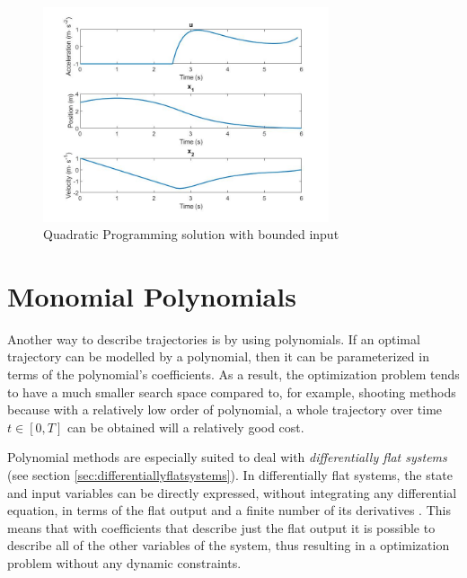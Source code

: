 \begin{figure}[h!]
\centering
\includegraphics[width=0.75\textwidth]{Images/quad_prog_constrained.jpg}
\caption{Quadratic Programming solution with bounded input}
\label{fig:solution_quad_prog_con}
\end{figure}


\section{Monomial Polynomials}

\par Another way to describe trajectories is by using polynomials. If an optimal trajectory can be modelled by a polynomial, then it can be parameterized in terms of the polynomial's coefficients. As a result, the optimization problem tends to have a much smaller search space compared to, for example, shooting methods because with a relatively low order of polynomial, a whole trajectory over time $t\in [0,T]$ can be obtained will a relatively good cost. 
\par Polynomial methods are especially suited to deal with \textit{differentially flat systems} (see section \ref{sec:differentiallyflatsystems}). In differentially flat systems, the state and input variables can be directly expressed, without integrating any differential equation, in terms of the flat output and a finite number of its derivatives \cite{fliess1995flatness}. This means that with coefficients that describe just the flat output it is possible to describe all of the other variables of the system, thus resulting in a optimization problem without any dynamic constraints.

